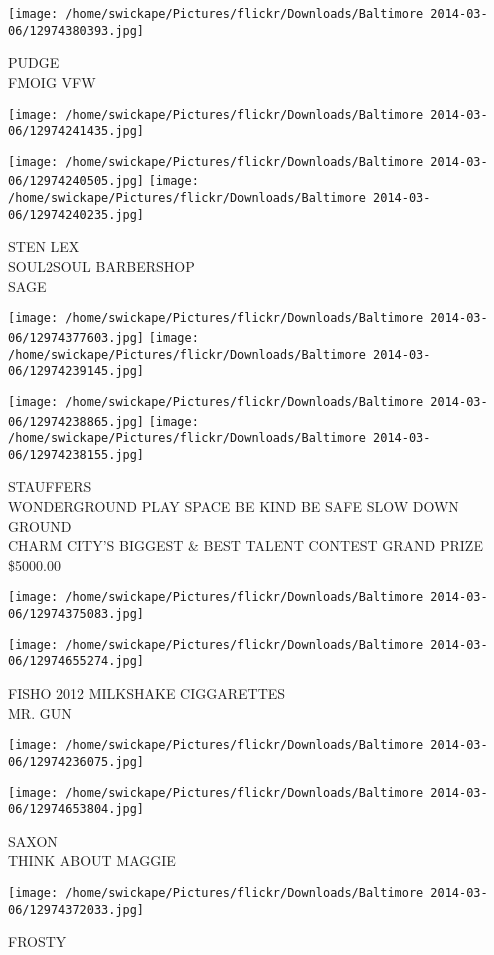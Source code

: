 \documentclass[10pt,letterpaper]{article}
\begin{document}
\vspace{0.25in}
\texttt{[image: /home/swickape/Pictures/flickr/Downloads/Baltimore 2014-03-06/12974380393.jpg]}

PUDGE\\
FMOIG VFW\\
\pagebreak

\texttt{[image: /home/swickape/Pictures/flickr/Downloads/Baltimore 2014-03-06/12974241435.jpg]}

\vspace{0.25in}
\texttt{[image: /home/swickape/Pictures/flickr/Downloads/Baltimore 2014-03-06/12974240505.jpg]}
\texttt{[image: /home/swickape/Pictures/flickr/Downloads/Baltimore 2014-03-06/12974240235.jpg]}

STEN LEX\\
SOUL2SOUL BARBERSHOP\\
SAGE\\
\pagebreak

\texttt{[image: /home/swickape/Pictures/flickr/Downloads/Baltimore 2014-03-06/12974377603.jpg]}
\texttt{[image: /home/swickape/Pictures/flickr/Downloads/Baltimore 2014-03-06/12974239145.jpg]}

\texttt{[image: /home/swickape/Pictures/flickr/Downloads/Baltimore 2014-03-06/12974238865.jpg]}
\texttt{[image: /home/swickape/Pictures/flickr/Downloads/Baltimore 2014-03-06/12974238155.jpg]}

STAUFFERS\\
WONDERGROUND PLAY SPACE BE KIND BE SAFE SLOW DOWN\\
GROUND\\
CHARM CITY'S BIGGEST \& BEST TALENT CONTEST GRAND PRIZE \$5000.00\\
\pagebreak

\texttt{[image: /home/swickape/Pictures/flickr/Downloads/Baltimore 2014-03-06/12974375083.jpg]}

\vspace{0.25in}
\texttt{[image: /home/swickape/Pictures/flickr/Downloads/Baltimore 2014-03-06/12974655274.jpg]}

FISHO 2012 MILKSHAKE CIGGARETTES\\
MR. GUN\\
\pagebreak

\texttt{[image: /home/swickape/Pictures/flickr/Downloads/Baltimore 2014-03-06/12974236075.jpg]}

\vspace{0.25in}
\texttt{[image: /home/swickape/Pictures/flickr/Downloads/Baltimore 2014-03-06/12974653804.jpg]}

SAXON\\
THINK ABOUT MAGGIE\\
\pagebreak

\texttt{[image: /home/swickape/Pictures/flickr/Downloads/Baltimore 2014-03-06/12974372033.jpg]}

FROSTY\\
\pagebreak
\end{document}
